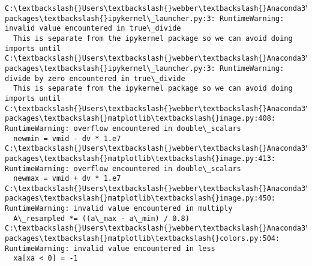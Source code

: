 \documentclass[11pt]{article}
\begin{document}
    \begin{Verbatim}[commandchars=\\\{\}]
C:\textbackslash{}Users\textbackslash{}webber\textbackslash{}Anaconda3\textbackslash{}lib\textbackslash{}site-packages\textbackslash{}ipykernel\_launcher.py:3: RuntimeWarning: invalid value encountered in true\_divide
  This is separate from the ipykernel package so we can avoid doing imports until
C:\textbackslash{}Users\textbackslash{}webber\textbackslash{}Anaconda3\textbackslash{}lib\textbackslash{}site-packages\textbackslash{}ipykernel\_launcher.py:3: RuntimeWarning: divide by zero encountered in true\_divide
  This is separate from the ipykernel package so we can avoid doing imports until
C:\textbackslash{}Users\textbackslash{}webber\textbackslash{}Anaconda3\textbackslash{}lib\textbackslash{}site-packages\textbackslash{}matplotlib\textbackslash{}image.py:408: RuntimeWarning: overflow encountered in double\_scalars
  newmin = vmid - dv * 1.e7
C:\textbackslash{}Users\textbackslash{}webber\textbackslash{}Anaconda3\textbackslash{}lib\textbackslash{}site-packages\textbackslash{}matplotlib\textbackslash{}image.py:413: RuntimeWarning: overflow encountered in double\_scalars
  newmax = vmid + dv * 1.e7
C:\textbackslash{}Users\textbackslash{}webber\textbackslash{}Anaconda3\textbackslash{}lib\textbackslash{}site-packages\textbackslash{}matplotlib\textbackslash{}image.py:450: RuntimeWarning: invalid value encountered in multiply
  A\_resampled *= ((a\_max - a\_min) / 0.8)
C:\textbackslash{}Users\textbackslash{}webber\textbackslash{}Anaconda3\textbackslash{}lib\textbackslash{}site-packages\textbackslash{}matplotlib\textbackslash{}colors.py:504: RuntimeWarning: invalid value encountered in less
  xa[xa < 0] = -1

    \end{Verbatim}

    \begin{center}
    \end{center}
    { \hspace*{\fill} \\}
    

    
    
    
    
\end{document}
